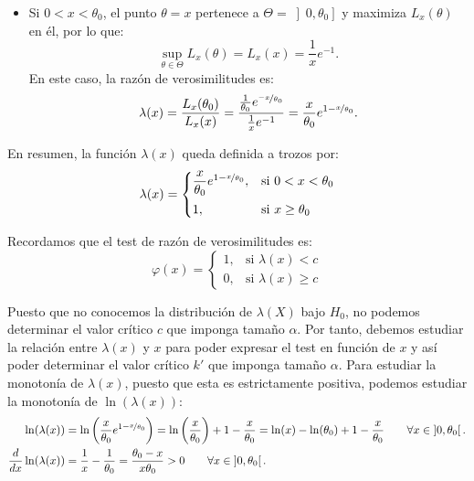 \begin{ejercicio}
\begin{itemize}
\begin{itemize}
            \item Si $0 < x < \theta_0$, el punto $\theta = x$ pertenece a $\Theta = \left]0, \theta_0\right]$ y maximiza $L_x(\theta)$ en él, por lo que:
            \begin{equation*}
                \sup\limits_{\theta \in \Theta} L_x(\theta) = L_x(x) = \frac{1}{x} e^{-1}.
            \end{equation*}
            En este caso, la razón de verosimilitudes es:
            \begin{equation*}
                \lambda(x) = \frac{L_x(\theta_0)}{L_x(x)} = \frac{\frac{1}{\theta_0} e^{\nicefrac{-x}{\theta_0}}}{\frac{1}{x} e^{-1}} = \frac{x}{\theta_0} e^{1 - \nicefrac{x}{\theta_0}}.
            \end{equation*}
        \end{itemize}
    \end{itemize}

    En resumen, la función $\lambda(x)$ queda definida a trozos por:
    \begin{equation*}
        \lambda(x) =
        \begin{cases}
            \dfrac{x}{\theta_0} e^{1 - \nicefrac{x}{\theta_0}}, & \text{si } 0 < x < \theta_0 \\[8pt]
            1, & \text{si } x \geq \theta_0
        \end{cases}
    \end{equation*}

    Recordamos que el test de razón de verosimilitudes es:
    \begin{equation*}
        \varphi(x) =
        \begin{cases}
            1, & \text{si } \lambda(x) < c \\[2pt]
            0, & \text{si } \lambda(x) \geq c
        \end{cases}
    \end{equation*}

    Puesto que no conocemos la distribución de $\lambda(X)$ bajo $H_0$, no podemos determinar el valor crítico $c$ que imponga tamaño $\alpha$. Por tanto, debemos estudiar la relación entre $\lambda(x)$ y $x$ para poder expresar el test en función de $x$ y así poder determinar el valor crítico $k'$ que imponga tamaño $\alpha$. Para estudiar la monotonía de $\lambda(x)$, puesto que esta es estrictamente positiva, podemos estudiar la monotonía de $\ln(\lambda(x))$:
    \begin{align*}
        \ln(\lambda(x)) &= \ln\left(\frac{x}{\theta_0} e^{1 - \nicefrac{x}{\theta_0}}\right) = \ln\left(\frac{x}{\theta_0}\right) + 1 - \frac{x}{\theta_0} = \ln(x) - \ln(\theta_0) + 1 - \frac{x}{\theta_0}\qquad \forall x \in \left]0, \theta_0\right[.\\
        \frac{d}{dx} \ln(\lambda(x)) &= \frac{1}{x} - \frac{1}{\theta_0} = \frac{\theta_0 - x}{x\theta_0} > 0 \qquad \forall x \in \left]0, \theta_0\right[.
    \end{align*}


\end{ejercicio}
